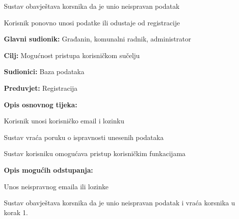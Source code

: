 \begin{packed_item}
\begin{packed_item}
								\item[] \begin{packed_enum}
								
								\item Sustav obavještava korsnika da je unio neispravan podatak
								\item Korisnik ponovno unosi podatke ili odustaje od registracije
								
							\end{packed_enum}
							
						\end{packed_item}
					\end{packed_item}
					
					
					\noindent {}
					\begin{packed_item}
	
						\item \textbf{Glavni sudionik: } Građanin, komunalni radnik, administrator
						\item  \textbf{Cilj:} Mogućnost pristupa korisničkom sučelju
						\item  \textbf{Sudionici:} Baza podataka
						\item  \textbf{Preduvjet:} Registracija
						\item  \textbf{Opis osnovnog tijeka:}
						
						\item[] \begin{packed_enum}
	
							\item Korisnik unosi korisničko email i lozinku
							\item Sustav vraća poruku o ispravnosti unesenih podataka
							\item Sustav korisniku omogućava pristup korisničkim funkacijama 
						\end{packed_enum}
						
						\item  \textbf{Opis mogućih odstupanja:}
						
						\item[] \begin{packed_item}
	
							\item[2.a] Unos neispravnog emaila ili lozinke
							
							\item[] \begin{packed_enum}
								
								\item Sustav obavještava korsnika da je unio neispravan podatak i vraća korsnika u korak 1.
								
							\end{packed_enum}
													
						\end{packed_item}
					\end{packed_item}



